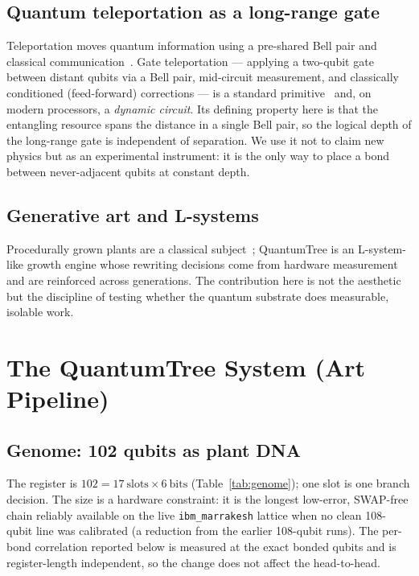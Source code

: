 \documentclass[conference]{IEEEtran}
\begin{document}
\subsection{Quantum teleportation as a long-range gate}

Teleportation moves quantum information using a pre-shared Bell pair and classical
communication~\cite{nielsen2010}. Gate teleportation --- applying a two-qubit gate between
distant qubits via a Bell pair, mid-circuit measurement, and classically conditioned
(feed-forward) corrections --- is a standard primitive~\cite{gottesman1999} and, on modern
processors, a \emph{dynamic circuit}. Its defining property here is that the entangling
resource spans the distance in a single Bell pair, so the logical depth of the long-range
gate is independent of separation. We use it not to claim new physics but as an
experimental instrument: it is the only way to place a bond between never-adjacent qubits
at constant depth.

\subsection{Generative art and L-systems}

Procedurally grown plants are a classical subject~\cite{prusinkiewicz1990,galanter2003};
QuantumTree is an L-system-like growth engine whose rewriting decisions come from hardware
measurement and are reinforced across generations. The contribution here is not the
aesthetic but the discipline of testing whether the quantum substrate does measurable,
isolable work.

\section{The QuantumTree System (Art Pipeline)}

\subsection{Genome: 102 qubits as plant DNA}

The register is $102 = 17\ \text{slots} \times 6\ \text{bits}$
(Table~\ref{tab:genome}); one slot is one branch decision. The size is a hardware
constraint: it is the longest low-error, SWAP-free chain reliably available on the live
\texttt{ibm\_marrakesh} lattice when no clean 108-qubit line was calibrated (a reduction
from the earlier 108-qubit runs). The per-bond correlation reported below is measured at
the exact bonded qubits and is register-length independent, so the change does not affect
the head-to-head.
\end{document}
